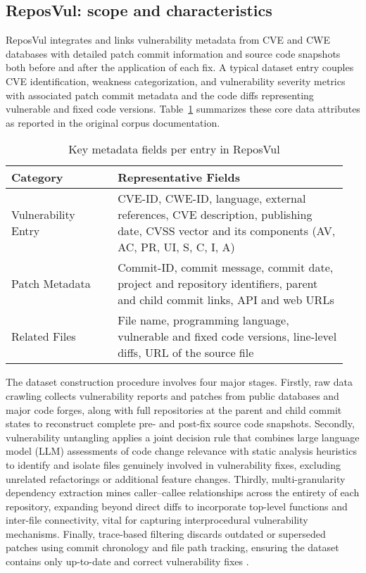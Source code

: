 \documentclass{buthesis}
\begin{document}
\subsection{ReposVul: scope and characteristics}
\label{subsec:reposvul-scope}

ReposVul integrates and links vulnerability metadata from CVE and CWE databases with detailed patch commit information and source code snapshots both before and after the application of each fix. A typical dataset entry couples CVE identification, weakness categorization, and vulnerability severity metrics with associated patch commit metadata and the code diffs representing vulnerable and fixed code versions. Table~\ref{tab:reposvul-fields} summarizes these core data attributes as reported in the original corpus documentation.

\begin{table}[H]
\centering
\caption{Key metadata fields per entry in ReposVul}
\label{tab:reposvul-fields}
\begin{tabular}{p{0.3\linewidth} p{0.65\linewidth}}
\toprule
\textbf{Category} & \textbf{Representative Fields} \\
\midrule
Vulnerability Entry & CVE-ID, CWE-ID, language, external references, CVE description, publishing date, CVSS vector and its components (AV, AC, PR, UI, S, C, I, A) \\
Patch Metadata & Commit-ID, commit message, commit date, project and repository identifiers, parent and child commit links, API and web URLs \\
Related Files & File name, programming language, vulnerable and fixed code versions, line-level diffs, URL of the source file \\
\bottomrule
\end{tabular}
\end{table}

The dataset construction procedure involves four major stages. Firstly, raw data crawling collects vulnerability reports and patches from public databases and major code forges, along with full repositories at the parent and child commit states to reconstruct complete pre- and post-fix source code snapshots. Secondly, vulnerability untangling applies a joint decision rule that combines large language model (LLM) assessments of code change relevance with static analysis heuristics to identify and isolate files genuinely involved in vulnerability fixes, excluding unrelated refactorings or additional feature changes. Thirdly, multi-granularity dependency extraction mines caller–callee relationships across the entirety of each repository, expanding beyond direct diffs to incorporate top-level functions and inter-file connectivity, vital for capturing interprocedural vulnerability mechanisms. Finally, trace-based filtering discards outdated or superseded patches using commit chronology and file path tracking, ensuring the dataset contains only up-to-date and correct vulnerability fixes \cite{wang2024reposvul}.
\end{document}
